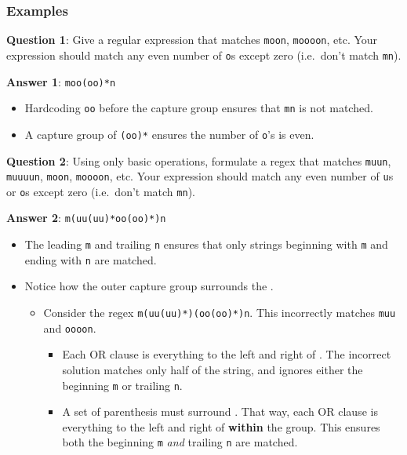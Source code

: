 \documentclass[
  letterpaper,
  DIV=11,
  numbers=noendperiod]{scrreprt}
\providecommand{\tightlist}{%
  \setlength{\itemsep}{0pt}\setlength{\parskip}{0pt}}\usepackage{longtable,booktabs,array}
\begin{document}
\subsubsection{Examples}\label{examples}

\textbf{Question 1}: Give a regular expression that matches
\texttt{moon}, \texttt{moooon}, etc. Your expression should match any
even number of \texttt{o}s except zero (i.e.~don't match \texttt{mn}).

\textbf{Answer 1}: \texttt{moo(oo)*n}

\begin{itemize}
\tightlist
\item
  Hardcoding \texttt{oo} before the capture group ensures that
  \texttt{mn} is not matched.
\item
  A capture group of \texttt{(oo)*} ensures the number of \texttt{o}'s
  is even.
\end{itemize}

\textbf{Question 2}: Using only basic operations, formulate a regex that
matches \texttt{muun}, \texttt{muuuun}, \texttt{moon}, \texttt{moooon},
etc. Your expression should match any even number of \texttt{u}s or
\texttt{o}s except zero (i.e.~don't match \texttt{mn}).

\textbf{Answer 2}: \texttt{m(uu(uu)*\textbar{}oo(oo)*)n}

\begin{itemize}
\tightlist
\item
  The leading \texttt{m} and trailing \texttt{n} ensures that only
  strings beginning with \texttt{m} and ending with \texttt{n} are
  matched.
\item
  Notice how the outer capture group surrounds the \texttt{\textbar{}}.

  \begin{itemize}
  \tightlist
  \item
    Consider the regex \texttt{m(uu(uu)*)\textbar{}(oo(oo)*)n}. This
    incorrectly matches \texttt{muu} and \texttt{oooon}.

    \begin{itemize}
    \tightlist
    \item
      Each OR clause is everything to the left and right of
      \texttt{\textbar{}}. The incorrect solution matches only half of
      the string, and ignores either the beginning \texttt{m} or
      trailing \texttt{n}.
    \item
      A set of parenthesis must surround \texttt{\textbar{}}. That way,
      each OR clause is everything to the left and right of
      \texttt{\textbar{}} \textbf{within} the group. This ensures both
      the beginning \texttt{m} \emph{and} trailing \texttt{n} are
      matched.
    \end{itemize}
  \end{itemize}
\end{itemize}
\end{document}
